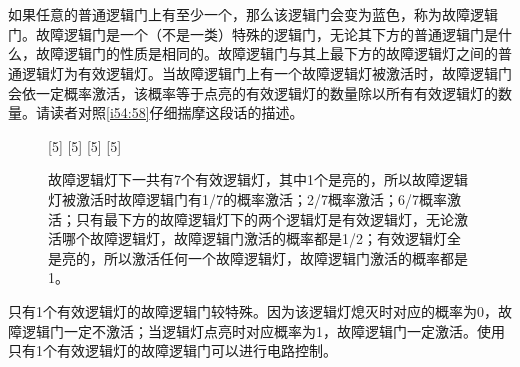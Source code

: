 \section{}

如果任意的普通逻辑门上有至少一个，那么该逻辑门会变为蓝色，称为故障逻辑门。故障逻辑门是一个（不是一类）特殊的逻辑门，无论其下方的普通逻辑门是什么，故障逻辑门的性质是相同的。故障逻辑门与其上最下方的故障逻辑灯之间的普通逻辑灯为有效逻辑灯。当故障逻辑门上有一个故障逻辑灯被激活时，故障逻辑门会依一定概率激活，该概率等于点亮的有效逻辑灯的数量除以所有有效逻辑灯的数量。请读者对照\autoref{i54:58}仔细揣摩这段话的描述。

\begin{figure}[!ht]
  \centering
  [5]%
  [5]%
  [5]%
  [5]%
  \caption{\protect{}故障逻辑灯下一共有7个有效逻辑灯，其中1个是亮的，所以故障逻辑灯被激活时故障逻辑门有1/7的概率激活；\protect{}2/7概率激活；\protect{}6/7概率激活；\protect{}只有最下方的故障逻辑灯下的两个逻辑灯是有效逻辑灯，无论激活哪个故障逻辑灯，故障逻辑门激活的概率都是1/2；\protect{}有效逻辑灯全是亮的，所以激活任何一个故障逻辑灯，故障逻辑门激活的概率都是1。}
  \label{i54:58}
\end{figure}

只有1个有效逻辑灯的故障逻辑门较特殊。因为该逻辑灯熄灭时对应的概率为0，故障逻辑门一定不激活；当逻辑灯点亮时对应概率为1，故障逻辑门一定激活。使用只有1个有效逻辑灯的故障逻辑门可以进行电路控制。


